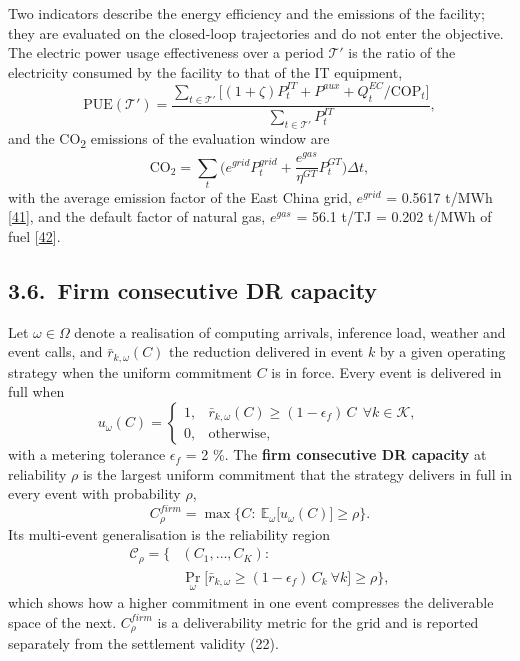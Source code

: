 \documentclass[a4paper,twocolumn,fleqn,10pt]{article}
\begin{document}
Two indicators describe the energy efficiency and the emissions of the facility; they are evaluated on the closed-loop trajectories and do not enter the objective. The electric power usage effectiveness over a period \(\mathcal T'\) is the ratio of the electricity consumed by the facility to that of the IT equipment, \[\mathrm{PUE}(\mathcal T')=\frac{\sum_{t\in\mathcal T'}\big[(1+\zeta)P^{IT}_t+P^{aux}+Q^{EC}_t/\mathrm{COP}_t\big]}{\sum_{t\in\mathcal T'}P^{IT}_t}, \tag{31}\] and the CO\textsubscript{2} emissions of the evaluation window are \[\mathrm{CO_2}=\sum_t\Big(e^{grid}P^{grid}_t+\frac{e^{gas}}{\eta^{GT}}P^{GT}_t\Big)\Delta t, \tag{32}\] with the average emission factor of the East China grid, \(e^{grid}\) = 0.5617 t/MWh [\hyperlink{ref41}{41}], and the default factor of natural gas, \(e^{gas}\) = 56.1 t/TJ = 0.202 t/MWh of fuel [\hyperlink{ref42}{42}].

\subsection*{3.6.~Firm consecutive DR capacity}

Let \(\omega\in\Omega\) denote a realisation of computing arrivals, inference load, weather and event calls, and \(\bar r_{k,\omega}(C)\) the reduction delivered in event \(k\) by a given operating strategy when the uniform commitment \(C\) is in force. Every event is delivered in full when \[u_\omega(C)=\begin{cases}1,&\bar r_{k,\omega}(C)\ge(1-\epsilon_f)\,C\ \ \forall k\in\mathcal K,\\0,&\text{otherwise},\end{cases} \tag{33}\] with a metering tolerance \(\epsilon_f\) = 2 \%. The \textbf{firm consecutive DR capacity} at reliability \(\rho\) is the largest uniform commitment that the strategy delivers in full in every event with probability \(\rho\), \[C^{firm}_\rho=\max\big\{C:\ \mathbb E_\omega\big[u_\omega(C)\big]\ge\rho\big\}. \tag{34}\] Its multi-event generalisation is the reliability region \[\begin{aligned}\mathcal C_\rho=\Big\{&(C_1,\dots,C_K):\\&\Pr_\omega\big[\bar r_{k,\omega}\ge(1-\epsilon_f)\,C_k\ \forall k\big]\ge\rho\Big\},\end{aligned} \tag{35}\] which shows how a higher commitment in one event compresses the deliverable space of the next. \(C^{firm}_\rho\) is a deliverability metric for the grid and is reported separately from the settlement validity (22).
\end{document}
